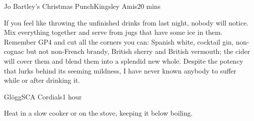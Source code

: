 \documentclass{book}
\begin{document}
\begin{recipe}{Jo Bartley's Christmas Punch}{Kingsley Amis}{20 mins}

  If you feel like throwing the unfinished drinks from last night, nobody will
  notice. Mix everything together and serve from jugs that have some ice in
  them. Remember GP4 and cut all the corners you can: Spanish white, cocktail
  gin, non-cognac but not non-French brandy, British sherry and British
  vermouth; the cider will cover them and blend them into a splendid new
  whole. Despite the potency that lurks behind its seeming mildness, I have
  never known anybody to suffer while or after drinking it.
\end{recipe}

\begin{recipe}{Gl\"{o}gg}{SCA Cordials}{1 hour}

  Heat in a slow cooker or on the stove, keeping it below boiling.

\end{recipe}
\end{document}
